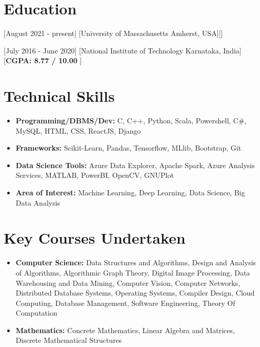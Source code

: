 \documentclass{article}
\begin{document}

\makecvtitle %


\section{Education}

[August 2021 - present]
[University of Massachusetts Amherst, USA][]

[July 2016 - June 2020]
[National Institute of Technology Karnataka, India] [\textbf{CGPA: 8.77 / 10.00 }]


\section{Technical Skills}

\begin{itemize}

\item \textbf{Programming/DBMS/Dev:} C, C++, Python, Scala, Powershell, C#, MySQL, HTML, CSS, ReactJS, Django
\item \textbf{Frameworks:} Scikit-Learn, Pandas, Tensorflow, MLlib, Bootstrap, Git
\item \textbf{Data Science Tools:} Azure Data Explorer, Apache Spark, Azure Analysis Services, MATLAB, PowerBI, OpenCV, GNUPlot
\item \textbf{Area of Interest:} Machine Learning, Deep Learning, Data Science, Big Data Analysis 

\end{itemize}

\section{Key Courses Undertaken}

\begin{itemize}
\item \textbf{Computer Science:} Data Structures and Algorithms, Design and Analysis of Algorithms, Algorithmic Graph Theory, Digital Image Processing, Data Warehousing and Data Mining, Computer Vision, Computer Networks, Distributed Database Systems, Operating Systems, Compiler Design, Cloud Computing, Database Management, Software Engineering, Theory Of Computation
\item \textbf{Mathematics:} Concrete Mathematics, Linear Algebra and Matrices, Discrete Mathematical Structures
\end{itemize}
\end{document}
